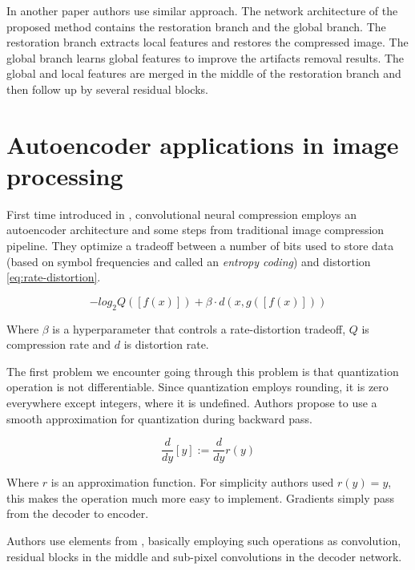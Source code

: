 In another paper \cite{li_learning_2020} authors use similar approach. The network architecture of the proposed method contains the restoration branch and the global branch. The restoration branch extracts local features and restores the compressed image. The global branch learns global features to improve the artifacts removal results. The global and local features are merged in the middle of the restoration branch and then follow up by several residual blocks.

\section{Autoencoder applications in image processing}

First time introduced in \cite{toderici_full_2017}, convolutional neural compression employs an autoencoder architecture and some steps from traditional image compression pipeline. They optimize a tradeoff between a number of bits used to store data (based on symbol frequencies and called an \textit{entropy coding}) and distortion \ref{eq:rate-distortion}.

\begin{equation}
    \label{eq:rate-distortion}
    − log_2 Q ([f (x)]) + \beta · d (x, g([f (x)]))
\end{equation}

Where $\beta$ is a hyperparameter that controls a rate-distortion tradeoff, $Q$ is compression rate and $d$ is distortion rate.

The first problem we encounter going through this problem is that quantization operation is not differentiable. Since quantization employs rounding, it is zero everywhere except integers, where it is undefined. Authors propose to use a smooth approximation for quantization during backward pass.

\begin{equation}
    \label{eq:quantization}
    \frac{d}{dy}[y]:=\frac{d}{dy}r(y)
\end{equation}

Where $r$ is an approximation function. For simplicity authors used $r(y)=y$, this makes the operation much more easy to implement. Gradients simply pass from the decoder to encoder.

Authors use elements from \cite{shi_real-time_2016}, basically employing such operations as convolution, residual blocks in the middle and sub-pixel convolutions in the decoder network.

